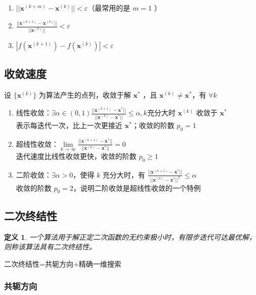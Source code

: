 \documentclass{book}
\newtheorem{definition}{\indent 定义}[chapter]
\begin{document}
\begin{enumerate}
    \item $ ||\boldsymbol{x}^{(k+m)}-\boldsymbol{x}^{(k)}|| < \varepsilon $（最常用的是 $ m=1 $ ）
    \item $\frac{||\boldsymbol{x}^{(k+1)}-\boldsymbol{x}^{(k)}||}{||\boldsymbol{x}^{(k)}||}<\varepsilon$
    \item $|f(\boldsymbol{x}^{(k+1)})-f(\boldsymbol{x}^{(k)})|<\varepsilon$
\end{enumerate}

\subsection{收敛速度}

设 $\{\boldsymbol{x}^{(k)}\}$ 为算法产生的点列，收敛于解 $\boldsymbol{x}^*$ ，且 $\boldsymbol{x}^{(k)}\ne\boldsymbol{x}^*$，有 $\forall k$

\begin{enumerate}
    \item 线性收敛：$\exists \alpha\in(0,1)\frac{||\boldsymbol{x}^{(k+1)}-\boldsymbol{x}^*||}{||\boldsymbol{x}^{(k)}-\boldsymbol{x}^*||}\le\alpha, k$充分大时 $\boldsymbol{x}^{(k)}$ 收敛于 $\boldsymbol{x}^*$\\
          表示每迭代一次，比上一次更接近 $\boldsymbol{x}^*$；收敛的阶数 $p_0=1$
    \item 超线性收敛：$\lim\limits_{k \rightarrow \infty}\frac{||\boldsymbol{x}^{(k+1)}-\boldsymbol{x}^*||}{||\boldsymbol{x}^{(k)}-\boldsymbol{x}^*||}=0$\\
          迭代速度比线性收敛更快，收敛的阶数 $p_0\ge1$
    \item 二阶收敛：$\exists\alpha>0$，使得 $k$ 充分大时，有 $\frac{||\boldsymbol{x}^{(k+1)}-\boldsymbol{x}^*||}{||\boldsymbol{x}^{(k)}-\boldsymbol{x}^*||^2}\le\alpha$\\
          收敛的阶数 $p_0=2$，说明二阶收敛是超线性收敛的一个特例
\end{enumerate}

\subsection{二次终结性}
\begin{definition}
    一个算法用于解正定二次函数的无约束极小时，有限步迭代可达最优解，则称该算法具有二次终结性。
\end{definition}

二次终结性=共轭方向+精确一维搜索

\subsubsection{共轭方向}
\end{document}
